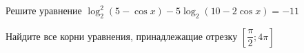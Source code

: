 \begin{ex}
	\begin{condition}
		\begin{enumcols}[label=\asbuk*)]
			\item Решите уравнение \( \log_2^2 (5 - \cos x ) - 5\log_2 (10 -  2\cos x) = -11 \)
			\item Найдите все корни уравнения, принадлежащие отрезку \(  \left[\dfrac{\pi}{2};4\pi\right] \)
		\end{enumcols}
	\end{condition}
\end{ex}

